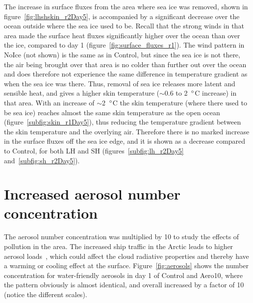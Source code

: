 The increase in surface fluxes from the area where sea ice was removed, shown in figure~\ref{fig:lhshskin_r2Day5}, is accompanied by a significant decrease over the ocean outside where the sea ice used to be. Recall that the strong winds in that area made the surface heat fluxes significantly higher over the ocean than over the ice, compared to day 1 (figure~\ref{fig:surface_fluxes_r1}). The wind pattern in NoIce (not shown) is the same as in Control, but since the sea ice is not there, the air being brought over that area is no colder than further out over the ocean and does therefore not experience the same difference in temperature gradient as when the sea ice was there. Thus, removal of sea ice releases more latent and sensible heat, and gives a higher skin temperature ($\sim$0.6 to 2~$\degree$C increase) in that area. With an increase of $\sim$2~$\degree$C the skin temperature (where there used to be sea ice) reaches almost the same skin temperature as the open ocean (figure~\ref{subfig:skin_r1Day5}), thus reducing the temperature gradient between the skin temperature and the overlying air. Therefore there is no marked increase in the surface fluxes off the sea ice edge, and it is shown as a decrease compared to Control, for both LH and SH (figures~\ref{subfig:lh_r2Day5} and~\ref{subfig:sh_r2Day5}).

\clearpage
\section{Increased aerosol number concentration}
The aerosol number concentration was multiplied by 10 to study the effects of pollution in the area. The increased ship traffic in the Arctic leads to higher aerosol loads~\citep{Eckhardt2013}, which could affect the cloud radiative properties and thereby have a warming or cooling effect at the surface. Figure~\ref{fig:aerosols} shows the number concentration for water-friendly aerosols in day 1 of Control and Aero10, where the pattern obviously is almost identical, and overall increased by a factor of 10 (notice the different scales).

